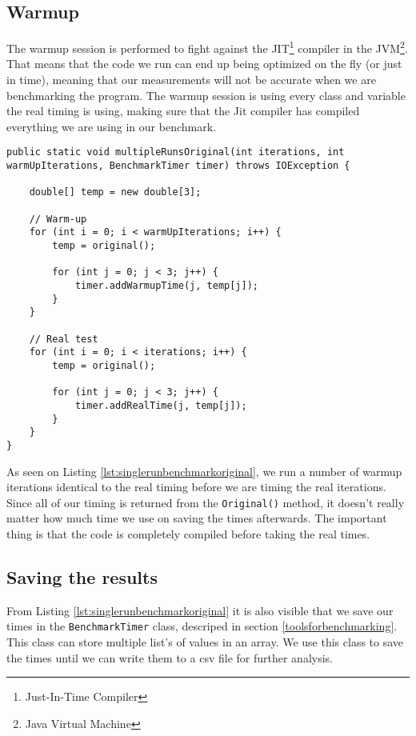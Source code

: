 \documentclass{article}
\begin{document}
\subsection{Warmup}
The warmup session is performed to fight against the JIT\footnote{Just-In-Time Compiler} compiler in the JVM\footnote{Java Virtual Machine}.
That means that the code we run can end up being optimized on the fly (or just in time), meaning that our measurements will not be accurate 
when we are benchmarking the program. The warmup session is using every class and variable the real timing is using, making sure that 
the Jit compiler has compiled everything we are using in our benchmark. 

\begin{lstlisting}[caption={Warmup implementaion},label={lst:singlerunbenchmarkoriginal}]
public static void multipleRunsOriginal(int iterations, int warmUpIterations, BenchmarkTimer timer) throws IOException {

    double[] temp = new double[3];

    // Warm-up
    for (int i = 0; i < warmUpIterations; i++) {
        temp = original();

        for (int j = 0; j < 3; j++) {
            timer.addWarmupTime(j, temp[j]);
        }
    }

    // Real test
    for (int i = 0; i < iterations; i++) {
        temp = original();

        for (int j = 0; j < 3; j++) {
            timer.addRealTime(j, temp[j]);
        }
    }
}
\end{lstlisting}

As seen on Listing \ref{lst:singlerunbenchmarkoriginal}, we run a number of warmup iterations identical to the real timing
before we are timing the real iterations. Since all of our timing is returned from the \lstinline{Original()} method, 
it doesn't really matter how much time we use on saving the times afterwards. The important thing is that the code is completely 
compiled before taking the real times. 

\subsection{Saving the results}
From Listing \ref{lst:singlerunbenchmarkoriginal} it is also visible that we save our times in the \lstinline{BenchmarkTimer} class, 
descriped in section \ref{toolsforbenchmarking}. This class can store multiple list's of values in an array. 
We use this class to save the times until we can write them to a csv file for further analysis. 
\end{document}

